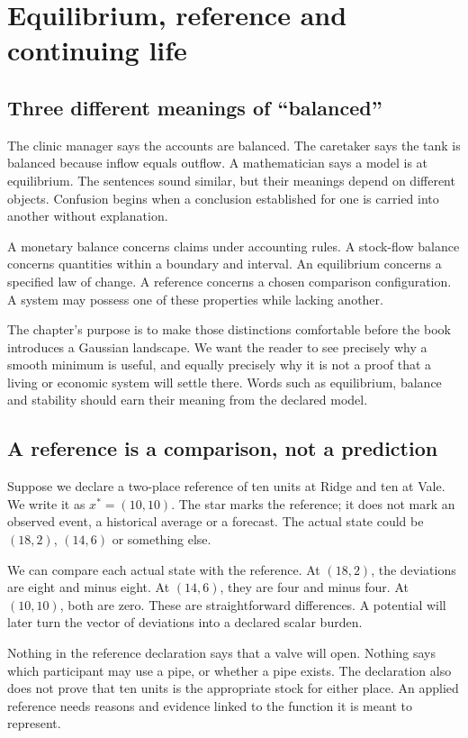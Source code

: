 \chapter{Equilibrium, reference and continuing life}\label{ch:equilibrium}

\section{Three different meanings of ``balanced''}
The clinic manager says the accounts are balanced. The caretaker says the tank is balanced because inflow equals outflow. A mathematician says a model is at equilibrium. The sentences sound similar, but their meanings depend on different objects. Confusion begins when a conclusion established for one is carried into another without explanation.

A monetary balance concerns claims under accounting rules. A stock-flow balance concerns quantities within a boundary and interval. An equilibrium concerns a specified law of change. A reference concerns a chosen comparison configuration. A system may possess one of these properties while lacking another.

The chapter's purpose is to make those distinctions comfortable before the book introduces a Gaussian landscape. We want the reader to see precisely why a smooth minimum is useful, and equally precisely why it is not a proof that a living or economic system will settle there. Words such as equilibrium, balance and stability should earn their meaning from the declared model.

\section{A reference is a comparison, not a prediction}
Suppose we declare a two-place reference of ten units at Ridge and ten at Vale. We write it as $x^*=(10,10)$. The star marks the reference; it does not mark an observed event, a historical average or a forecast. The actual state could be $(18,2)$, $(14,6)$ or something else.

We can compare each actual state with the reference. At $(18,2)$, the deviations are eight and minus eight. At $(14,6)$, they are four and minus four. At $(10,10)$, both are zero. These are straightforward differences. A potential will later turn the vector of deviations into a declared scalar burden.

Nothing in the reference declaration says that a valve will open. Nothing says which participant may use a pipe, or whether a pipe exists. The declaration also does not prove that ten units is the appropriate stock for either place. An applied reference needs reasons and evidence linked to the function it is meant to represent.

